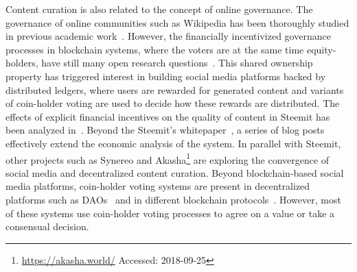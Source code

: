 Content curation is also related to the concept of online governance. The governance of online communities such as Wikipedia has been thoroughly studied in previous academic work~\cite{leskovec2010governance,forte2008scaling}. However, the financially incentivized governance processes in blockchain systems, where the voters are at the same time equity-holders, have still many open research questions~\cite{vitalik,ehrsam}. This shared ownership property has triggered interest in building social media platforms backed by distributed ledgers, where users are rewarded for generated content and variants of coin-holder voting are used to decide how these rewards are distributed.
The effects of explicit financial incentives on the quality of content in Steemit has been analyzed in~\cite{thelwall2017can}.
Beyond the Steemit's whitepaper~\cite{steemit}, a series of blog posts~\cite{curationRewards,selfvoters} effectively extend the economic analysis of the system. In parallel with Steemit, other projects such as Synereo\cite{synereo} and Akasha\footnote{\url{https://akasha.world/} Accessed: 2018-09-25} are exploring the convergence of social media and decentralized content curation.
Beyond blockchain-based social media platforms, coin-holder voting systems are present in decentralized platforms such as DAOs~\cite{darkdaos} and in different blockchain protocols~\cite{dash,tezos}. However, most of these systems use coin-holder voting processes to agree on a value or take a consensual decision.
